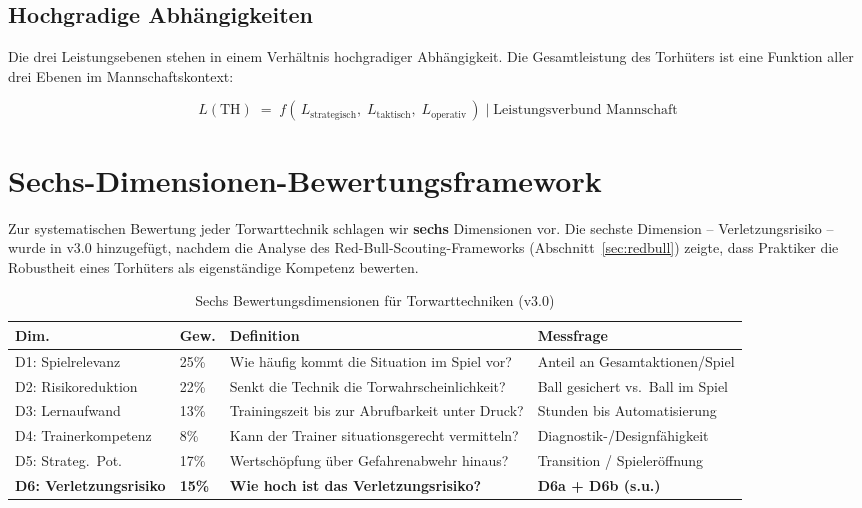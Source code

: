 \documentclass[12pt,a4paper]{article}
\begin{document}
\subsection{Hochgradige Abh\"angigkeiten}
\label{sec:abhaengigkeiten}

Die drei Leistungsebenen stehen in einem Verh\"altnis hochgradiger Abh\"angigkeit. Die Gesamtleistung des Torh\"uters ist eine Funktion aller drei Ebenen im Mannschaftskontext:

\begin{equation}
\label{eq:leistung}
L(\text{TH}) \;=\; f\!\left(\, L_{\text{strategisch}},\; L_{\text{taktisch}},\; L_{\text{operativ}} \,\right) \;\Big|\; \text{Leistungsverbund Mannschaft}
\end{equation}


\section{Sechs-Dimensionen-Bewertungsframework}
\label{sec:framework}

Zur systematischen Bewertung jeder Torwarttechnik schlagen wir \textbf{sechs} Dimensionen vor. Die sechste Dimension -- Verletzungsrisiko -- wurde in v3.0 hinzugef\"ugt, nachdem die Analyse des Red-Bull-Scouting-Frameworks (Abschnitt~\ref{sec:redbull}) zeigte, dass Praktiker die Robustheit eines Torh\"uters als eigenst\"andige Kompetenz bewerten.

\begin{table}[H]
\centering
\caption{Sechs Bewertungsdimensionen f\"ur Torwarttechniken (v3.0)}
\label{tab:dimensionen}
\begin{tabularx}{\textwidth}{@{}l l X X@{}}
\toprule
\textbf{Dim.} & \textbf{Gew.} & \textbf{Definition} & \textbf{Messfrage} \\
\midrule
D1: Spielrelevanz & 25\% & Wie h\"aufig kommt die Situation im Spiel vor? & Anteil an Gesamtaktionen/Spiel \\[4pt]
D2: Risikoreduktion & 22\% & Senkt die Technik die Torwahrscheinlichkeit? & Ball gesichert vs.\ Ball im Spiel \\[4pt]
D3: Lernaufwand & 13\% & Trainingszeit bis zur Abrufbarkeit unter Druck? & Stunden bis Automatisierung \\[4pt]
D4: Trainerkompetenz & 8\% & Kann der Trainer situationsgerecht vermitteln? & Diagnostik-/Designf\"ahigkeit \\[4pt]
D5: Strateg.\ Pot. & 17\% & Wertsch\"opfung \"uber Gefahrenabwehr hinaus? & Transition / Spieler\"offnung \\[4pt]
\textbf{D6: Verletzungsrisiko} & \textbf{15\%} & \textbf{Wie hoch ist das Verletzungsrisiko?} & \textbf{D6a + D6b (s.u.)} \\
\bottomrule
\end{tabularx}
\end{table}
\end{document}
